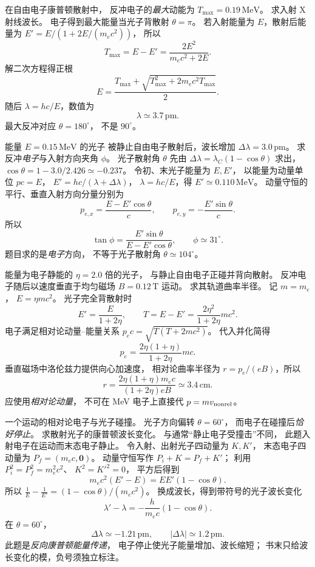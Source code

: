 在自由电子康普顿散射中，
反冲电子的\emph{最大}动能为
$T_{\max}=0.19\,\mathrm{MeV}$。
求入射 X 射线波长。
\exsolution
电子得到最大能量当光子背散射 $\theta=\pi$。
若入射能量为 $E$，散射后能量为
$E'=E/(1+2E/(m_ec^2))$，
所以
\[
 T_{\max}=E-E'=
 \frac{2E^2}{m_ec^2+2E}.
\]
解二次方程得正根
\[
 \boxed{E=
 \frac{T_{\max}+
 \sqrt{T_{\max}^2+2m_ec^2T_{\max}}}{2}}.
\]
随后 $\lambda=hc/E$，数值为
\[
 \boxed{\lambda\simeq3.7\,\mathrm{pm}}.
\]
\excheck 最大反冲对应 $\theta=180^\circ$，
不是 $90^\circ$。

能量 $E=0.15\,\mathrm{MeV}$ 的光子
被静止自由电子散射后，波长增加
$\Delta\lambda=3.0\,\mathrm{pm}$。
求反冲\emph{电子}与入射方向夹角 $\phi$。
\exsolution
光子散射角 $\theta$ 先由
$\Delta\lambda=\lambda_C(1-\cos\theta)$ 求出，
$\cos\theta=1-3.0/2.426\simeq-0.237$。
令初、末光子能量为 $E,E'$，
以能量为动量单位 $pc=E$，
$E'=hc/(\lambda+\Delta\lambda)$，
$\lambda=hc/E$，得
$E'\simeq0.110\,\mathrm{MeV}$。
动量守恒的平行、垂直入射方向分量分别为
\[
 p_{e,x}=\frac{E-E'\cos\theta}{c},
 \qquad p_{e,y}=-\frac{E'\sin\theta}{c}.
\]
所以
\[
 \boxed{\tan\phi=
 \frac{E'\sin\theta}{E-E'\cos\theta}},
 \qquad
 \boxed{\phi\simeq31^\circ}.
\]
\excheck 题目求的是\emph{电子}方向，
不等于光子散射角 $\theta\simeq104^\circ$。

能量为电子静能的 $\eta=2.0$ 倍的光子，
与静止自由电子正碰并背向散射。
反冲电子随后以速度垂直于均匀磁场
$B=0.12\,\mathrm T$ 运动。
求其轨道曲率半径。
\exsolution
记 $m=m_e$，
$E=\eta mc^2$。
光子完全背散射时
\[
 E'=\frac{E}{1+2\eta},\qquad
 T=E-E'=\frac{2\eta^2}{1+2\eta}mc^2.
\]
电子满足相对论动量--能量关系
$p_ec=\sqrt{T(T+2mc^2)}$。
代入并化简得
\[
 p_e=\frac{2\eta(1+\eta)}{1+2\eta}mc.
\]
垂直磁场中洛伦兹力提供向心加速度，
相对论曲率半径为 $r=p_e/(eB)$，所以
\[
 \boxed{r=\frac{2\eta(1+\eta)m_ec}{(1+2\eta)eB}
 \simeq3.4\,\mathrm{cm}}.
\]
\excheck 应使用\emph{相对论动量}，
不可在 MeV 电子上直接代 $p=mv_{\rm nonrel}$。

一个运动的相对论电子与光子碰撞。
光子方向偏转 $\theta=60^\circ$，
而电子在碰撞后\emph{恰好停止}。
求散射光子的康普顿波长变化。
\exsolution
与通常“静止电子受撞击”不同，
此题入射电子在运动而末态电子静止。
令入射、出射光子四动量为 $K,K'$，
末态电子四动量为 $P_f=(m_ec,\boldsymbol0)$。
动量守恒写作
$P_i+K=P_f+K'$；
利用 $P_i^2=P_f^2=m_e^2c^2$、
$K^2=K'^2=0$，
平方后得到
\[
 m_ec^2(E'-E)=EE'(1-\cos\theta).
\]
所以
$\tfrac1E-\tfrac1{E'}=(1-\cos\theta)/(m_ec^2)$。
换成波长，得到带符号的光子波长变化
\[
 \boxed{\lambda'-\lambda=
 -\frac h{m_ec}(1-\cos\theta)}.
\]
在 $\theta=60^\circ$，
\[
 \boxed{\Delta\lambda\simeq-1.21\,\mathrm{pm}},
 \qquad
 \boxed{|\Delta\lambda|\simeq1.2\,\mathrm{pm}}.
\]
\excheck 此题是\emph{反向康普顿能量传递}，
电子停止使光子能量增加、波长缩短；
书末只给波长变化的模，负号须独立标注。
